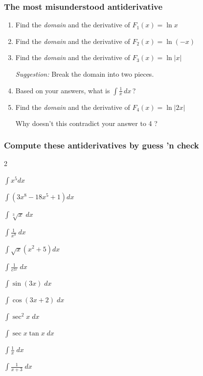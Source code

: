 \documentclass[14pt]{beamer}
\begin{document}
\begin{frame}[t]
	\fontsize{13}{13}\selectfont
	\frametitle{The most misunderstood antiderivative}
	\begin{enumerate}
		\item Find the \emph{domain} and the derivative of \;
			$\displaystyle F_{1}(x) = \ln x$
			\vspace{.1cm}

		\item Find the \emph{domain} and the derivative of \;
			$\displaystyle F_{2}(x) = \ln (-x)$
			\vspace{.1cm}

		\item Find the \emph{domain} and the derivative of \;
			$\displaystyle F_{3}(x) = \ln |x|$
			\vspace{.1cm}

			\emph{Suggestion:} Break the domain into two pieces.
			\vspace{.1cm}

		\item \label{qu:ln} Based on your answers, what is
			$\displaystyle \int \frac{1}{x}\,dx \,$?
			\vspace{.1cm}

		\item Find the \emph{domain} and the derivative of \;
			$\displaystyle F_{4}(x) = \ln |2x|$
			\vspace{.1cm}

			Why doesn't this contradict your answer to {\color{blue} 4} ?
	\end{enumerate}
\end{frame}

\begin{frame}[t]
	\fontsize{13}{13}\selectfont
	\frametitle{Compute these antiderivatives by guess 'n check}

	\begin{enumerate}
	\end{enumerate}
\end{frame}
\end{document}
